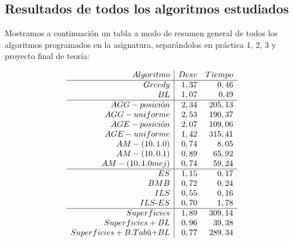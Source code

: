  
 
 
 

\newpage


\subsection{Resultados de todos los algoritmos estudiados }

Mostramos a continuación un tabla a modo de resumen general de todos los algoritmos programados en la asignatura, separándolos en práctica 1, 2, 3 y proyecto final de teoría:



\[
\begin{array}{r|*{4}{r}}{Algoritmo}&Desv&Tiempo\\\hline


{}Greedy&1,37&0,46\\

{}BL&1,07&0.49\\
\hline 

{}AGG-posici$\'o$n&2,34&205,13\\

{}AGG-uniforme&2,53&190,37\\

{}AGE-posici$\'o$n&2,07&109,06\\

{}AGE-uniforme&1,42&315,41\\

{}AM-(10,1.0)&0,74&8,05\\

{}AM-(10,0.1)&0,89&65,92\\

{}AM-(10,1.0mej)&0,74&59,24\\

\hline 

{}ES&1,15&0,17\\

{}BMB&0,72&0,24\\

{}ILS&0,55&0,16\\

{}ILS\text{-}ES&0,70&1,78 \\

\hline 

{}Superficies&1,89&309,14\\

{}Superficies+BL&0,96&39,38\\

{}Superficies+B.Tab$\'u$ + BL&0,77&289,34

\end{array}
\label{glob}
\]

